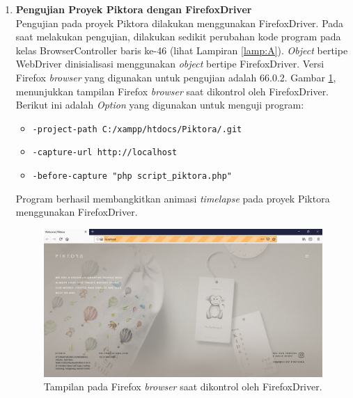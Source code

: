 \begin{enumerate}
\item \textbf{Pengujian Proyek Piktora dengan FirefoxDriver}\\
Pengujian pada proyek Piktora dilakukan menggunakan FirefoxDriver. Pada saat melakukan pengujian, dilakukan sedikit perubahan kode program pada kelas BrowserController baris ke-46 (lihat Lampiran \ref{lamp:A}). \textit{Object} bertipe WebDriver dinisialisasi menggunakan \textit{object} bertipe FirefoxDriver. Versi Firefox \textit{browser} yang digunakan untuk pengujian adalah 66.0.2. Gambar \ref{fig:firefox}, menunjukkan tampilan Firefox \textit{browser} saat dikontrol oleh FirefoxDriver. Berikut ini adalah \textit{Option} yang digunakan untuk menguji program:
\begin{itemize}
\item \texttt{-project-path C:/xampp/htdocs/Piktora/.git}
\item \texttt{-capture-url http://localhost}
\item \texttt{-before-capture "php script\_piktora.php"}
\end{itemize}
Program berhasil membangkitkan animasi \textit{timelapse} pada proyek Piktora menggunakan FirefoxDriver.

\begin{figure}[H]
	\centering
		\includegraphics[scale=0.4]{Gambar/Firefox.png}
	\caption{Tampilan pada Firefox \textit{browser} saat dikontrol oleh FirefoxDriver.}
	\label{fig:firefox}
\end{figure}





\end{enumerate}

